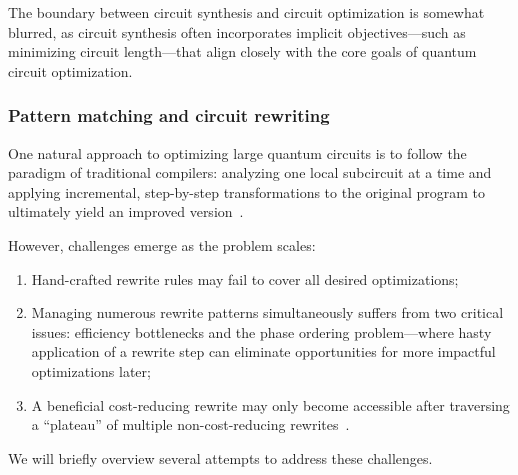 \documentclass[a4paper,onecolumn,11pt,unpublished]{quantumarticle}
\begin{document}
The boundary between circuit synthesis and circuit optimization is somewhat blurred, as circuit synthesis often incorporates implicit objectives---such as minimizing circuit length---that align closely with the core goals of quantum circuit optimization.



\subsubsection{Pattern matching and circuit rewriting}

One natural approach to optimizing large quantum circuits is to follow the paradigm of traditional compilers: analyzing one local subcircuit at a time and applying incremental, step-by-step transformations to the original program to ultimately yield an improved version~\cite{10.5555/1177220, sarkarNanopassInfrastructureCompiler, mckeemanPeepholeOptimization1965}.

However, challenges emerge as the problem scales:
\begin{enumerate}
\item Hand-crafted rewrite rules may fail to cover all desired optimizations;
\item Managing numerous rewrite patterns simultaneously suffers from two critical issues: efficiency bottlenecks and the phase ordering problem---where hasty application of a rewrite step can eliminate opportunities for more impactful optimizations later;
\item A beneficial cost-reducing rewrite may only become accessible after traversing a ``plateau'' of multiple non-cost-reducing rewrites~\cite{liQuarlLearningBasedQuantum2023}.
\end{enumerate}

We will briefly overview several attempts to address these challenges.
\end{document}
